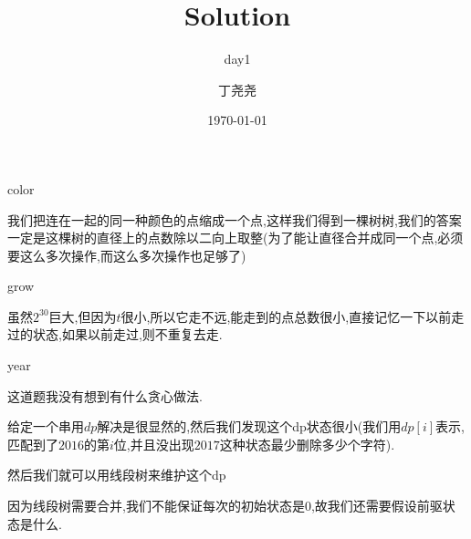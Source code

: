 \documentclass[11pt,serif]{beamer}
\begin{document}
	\author{丁尧尧}
	\title{Solution}
	\subtitle{day1}
	\date{\today}
	
	\begin{frame}[plain]
		\maketitle
	\end{frame}

	\begin{frame}{color}
		\begin{solution}
			我们把连在一起的同一种颜色的点缩成一个点,这样我们得到一棵树树,我们的答案一定是这棵树的直径上的点数除以二向上取整(为了能让直径合并成同一个点,必须要这么多次操作,而这么多次操作也足够了)
		\end{solution}
	\end{frame}

	\begin{frame}{grow} 
		\begin{solution}
			虽然$2^30$巨大,但因为$t$很小,所以它走不远,能走到的点总数很小,直接记忆一下以前走过的状态,如果以前走过,则不重复去走.
		\end{solution}	
	\end{frame}

	\begin{frame}{year}
		\begin{solution}
			这道题我没有想到有什么贪心做法.
			
			给定一个串用$dp$解决是很显然的,然后我们发现这个dp状态很小(我们用$dp[i]$表示,匹配到了$2016$的第$i$位,并且没出现$2017$这种状态最少删除多少个字符).
			
			然后我们就可以用线段树来维护这个dp
			
			因为线段树需要合并,我们不能保证每次的初始状态是0,故我们还需要假设前驱状态是什么.
			
		\end{solution}
	\end{frame} 
\end{document}
